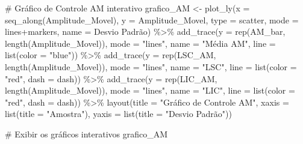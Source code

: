\documentclass[
  letterpaper,
  DIV=11,
  numbers=noendperiod]{scrartcl}
\newenvironment{Shaded}{\begin{snugshade}}{\end{snugshade}}
\newcommand{\AttributeTok}[1]{\textcolor[rgb]{0.40,0.45,0.13}{#1}}
\newcommand{\CommentTok}[1]{\textcolor[rgb]{0.37,0.37,0.37}{#1}}
\newcommand{\FunctionTok}[1]{\textcolor[rgb]{0.28,0.35,0.67}{#1}}
\newcommand{\NormalTok}[1]{\textcolor[rgb]{0.00,0.23,0.31}{#1}}
\newcommand{\OtherTok}[1]{\textcolor[rgb]{0.00,0.23,0.31}{#1}}
\newcommand{\SpecialCharTok}[1]{\textcolor[rgb]{0.37,0.37,0.37}{#1}}
\newcommand{\StringTok}[1]{\textcolor[rgb]{0.13,0.47,0.30}{#1}}
\begin{document}
\begin{Shaded}
\begin{Highlighting}[]
\CommentTok{\# Gráfico de Controle AM interativo}
\NormalTok{grafico\_AM }\OtherTok{\textless{}{-}} \FunctionTok{plot\_ly}\NormalTok{(}\AttributeTok{x =} \FunctionTok{seq\_along}\NormalTok{(Amplitude\_Movel), }\AttributeTok{y =}\NormalTok{ Amplitude\_Movel, }\AttributeTok{type =} \StringTok{\textquotesingle{}scatter\textquotesingle{}}\NormalTok{, }\AttributeTok{mode =} \StringTok{\textquotesingle{}lines+markers\textquotesingle{}}\NormalTok{,}
                     \AttributeTok{name =} \StringTok{\textquotesingle{}Desvio Padrão\textquotesingle{}}\NormalTok{) }\SpecialCharTok{\%\textgreater{}\%}
  \FunctionTok{add\_trace}\NormalTok{(}\AttributeTok{y =} \FunctionTok{rep}\NormalTok{(AM\_bar, }\FunctionTok{length}\NormalTok{(Amplitude\_Movel)), }\AttributeTok{mode =} \StringTok{"lines"}\NormalTok{, }\AttributeTok{name =} \StringTok{"Média AM"}\NormalTok{, }\AttributeTok{line =} \FunctionTok{list}\NormalTok{(}\AttributeTok{color =} \StringTok{"blue"}\NormalTok{)) }\SpecialCharTok{\%\textgreater{}\%}
  \FunctionTok{add\_trace}\NormalTok{(}\AttributeTok{y =} \FunctionTok{rep}\NormalTok{(LSC\_AM, }\FunctionTok{length}\NormalTok{(Amplitude\_Movel)), }\AttributeTok{mode =} \StringTok{"lines"}\NormalTok{, }\AttributeTok{name =} \StringTok{"LSC"}\NormalTok{, }\AttributeTok{line =} \FunctionTok{list}\NormalTok{(}\AttributeTok{color =} \StringTok{"red"}\NormalTok{, }\AttributeTok{dash =} \StringTok{\textquotesingle{}dash\textquotesingle{}}\NormalTok{)) }\SpecialCharTok{\%\textgreater{}\%}
  \FunctionTok{add\_trace}\NormalTok{(}\AttributeTok{y =} \FunctionTok{rep}\NormalTok{(LIC\_AM, }\FunctionTok{length}\NormalTok{(Amplitude\_Movel)), }\AttributeTok{mode =} \StringTok{"lines"}\NormalTok{, }\AttributeTok{name =} \StringTok{"LIC"}\NormalTok{, }\AttributeTok{line =} \FunctionTok{list}\NormalTok{(}\AttributeTok{color =} \StringTok{"red"}\NormalTok{, }\AttributeTok{dash =} \StringTok{\textquotesingle{}dash\textquotesingle{}}\NormalTok{)) }\SpecialCharTok{\%\textgreater{}\%}
  \FunctionTok{layout}\NormalTok{(}\AttributeTok{title =} \StringTok{"Gráfico de Controle AM"}\NormalTok{,}
         \AttributeTok{xaxis =} \FunctionTok{list}\NormalTok{(}\AttributeTok{title =} \StringTok{"Amostra"}\NormalTok{),}
         \AttributeTok{yaxis =} \FunctionTok{list}\NormalTok{(}\AttributeTok{title =} \StringTok{"Desvio Padrão"}\NormalTok{))}

\CommentTok{\# Exibir os gráficos interativos}
\NormalTok{grafico\_AM}
\end{Highlighting}
\end{Shaded}
\end{document}
